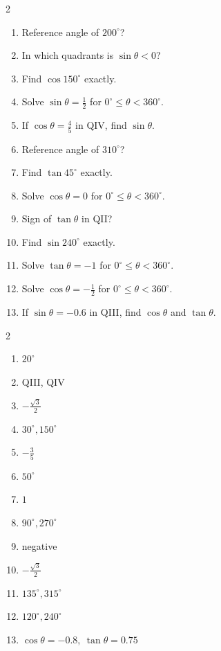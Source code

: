 \documentclass[11pt]{article}
\begin{document}
\begin{recapbox}
\begin{multicols}{2}
\small
\begin{enumerate}[leftmargin=*,itemsep=3pt]
  \item Reference angle of $200^\circ$?
  \item In which quadrants is $\sin\theta<0$?
  \item Find $\cos150^\circ$ exactly.
  \item Solve $\sin\theta=\tfrac12$ for $0^\circ\le\theta<360^\circ$.
  \item If $\cos\theta=\tfrac45$ in QIV, find $\sin\theta$.
  \item Reference angle of $310^\circ$?
  \item Find $\tan45^\circ$ exactly.
  \item Solve $\cos\theta=0$ for $0^\circ\le\theta<360^\circ$.
  \item Sign of $\tan\theta$ in QII?
  \item Find $\sin240^\circ$ exactly.
  \item Solve $\tan\theta=-1$ for $0^\circ\le\theta<360^\circ$.
  \item Solve $\cos\theta=-\tfrac12$ for $0^\circ\le\theta<360^\circ$.
  \item If $\sin\theta=-0.6$ in QIII, find $\cos\theta$ and $\tan\theta$.
\end{enumerate}
\end{multicols}
\end{recapbox}

\begin{keybox}
\begin{multicols}{2}
\small
\begin{enumerate}[leftmargin=*,itemsep=3pt]
  \item $20^\circ$
  \item QIII, QIV
  \item $-\tfrac{\sqrt3}{2}$
  \item $30^\circ,150^\circ$
  \item $-\tfrac35$
  \item $50^\circ$
  \item $1$
  \item $90^\circ,270^\circ$
  \item negative
  \item $-\tfrac{\sqrt3}{2}$
  \item $135^\circ,315^\circ$
  \item $120^\circ,240^\circ$
  \item $\cos\theta=-0.8,\ \tan\theta=0.75$
\end{enumerate}
\end{multicols}
\end{keybox}
\end{document}
